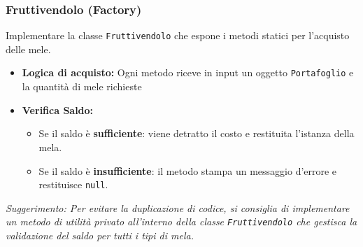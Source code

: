 \documentclass{article}
\begin{document}
\subsubsection*{Fruttivendolo (Factory)}
Implementare la classe \texttt{Fruttivendolo} che espone i metodi statici per l'acquisto delle mele.
\begin{itemize}
    \item \textbf{Logica di acquisto:} Ogni metodo riceve in input un oggetto \texttt{Portafoglio} e la quantità di mele richieste
    \item \textbf{Verifica Saldo:} 
        \begin{itemize}
            \item Se il saldo è \textbf{sufficiente}: viene detratto il costo e restituita l'istanza della mela.
            \item Se il saldo è \textbf{insufficiente}: il metodo stampa un messaggio d'errore e restituisce \texttt{null}.
        \end{itemize}
\end{itemize}
\newline
\textit{Suggerimento: Per evitare la duplicazione di codice, si consiglia di implementare un metodo di utilità privato all'interno della classe \texttt{Fruttivendolo} che gestisca la validazione del saldo per tutti i tipi di mela.}
\end{document}
